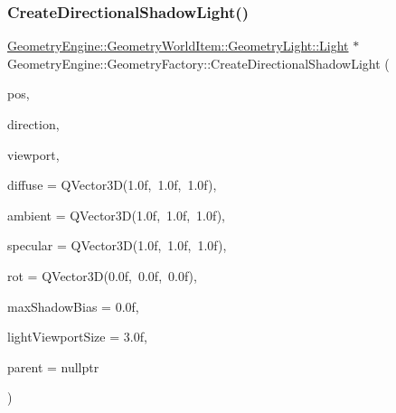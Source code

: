 \subsubsection{\texorpdfstring{CreateDirectionalShadowLight()}{CreateDirectionalShadowLight()}\hspace{0.1cm}{\footnotesize\ttfamily [2/2]}}
{\footnotesize\ttfamily \mbox{\hyperlink{class_geometry_engine_1_1_geometry_world_item_1_1_geometry_light_1_1_light}{Geometry\+Engine\+::\+Geometry\+World\+Item\+::\+Geometry\+Light\+::\+Light}} $\ast$ Geometry\+Engine\+::\+Geometry\+Factory\+::\+Create\+Directional\+Shadow\+Light (\begin{DoxyParamCaption}\item[{const Q\+Vector3D \&}]{pos,  }\item[{const Q\+Vector3D \&}]{direction,  }\item[{\mbox{\hyperlink{class_geometry_engine_1_1_geometry_item_utils_1_1_viewport}{Geometry\+Item\+Utils\+::\+Viewport}} $\ast$}]{viewport,  }\item[{const Q\+Vector3D \&}]{diffuse = {\ttfamily QVector3D(1.0f,~1.0f,~1.0f)},  }\item[{const Q\+Vector3D \&}]{ambient = {\ttfamily QVector3D(1.0f,~1.0f,~1.0f)},  }\item[{const Q\+Vector3D \&}]{specular = {\ttfamily QVector3D(1.0f,~1.0f,~1.0f)},  }\item[{const Q\+Vector3D \&}]{rot = {\ttfamily QVector3D(0.0f,~0.0f,~0.0f)},  }\item[{float}]{max\+Shadow\+Bias = {\ttfamily 0.0f},  }\item[{float}]{light\+Viewport\+Size = {\ttfamily 3.0f},  }\item[{\mbox{\hyperlink{class_geometry_engine_1_1_geometry_world_item_1_1_world_item}{Geometry\+World\+Item\+::\+World\+Item}} $\ast$}]{parent = {\ttfamily nullptr} }\end{DoxyParamCaption})\hspace{0.3cm}{\ttfamily [static]}}

